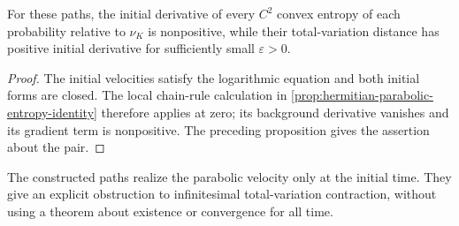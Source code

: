 \begin{corollary}\label{cor:individual-entropy-pair-growth}
For these paths, the initial derivative of every $C^2$ convex entropy of each probability relative to $\nu_K$ is nonpositive, while their total-variation distance has positive initial derivative for sufficiently small $\varepsilon>0$.
\end{corollary}
\begin{proof}
The initial velocities satisfy the logarithmic equation and both initial forms are closed. The local chain-rule calculation in \cref{prop:hermitian-parabolic-entropy-identity} therefore applies at zero; its background derivative vanishes and its gradient term is nonpositive. The preceding proposition gives the assertion about the pair.
\end{proof}

The constructed paths realize the parabolic velocity only at the initial time. They give an explicit obstruction to infinitesimal total-variation contraction, without using a theorem about existence or convergence for all time.

